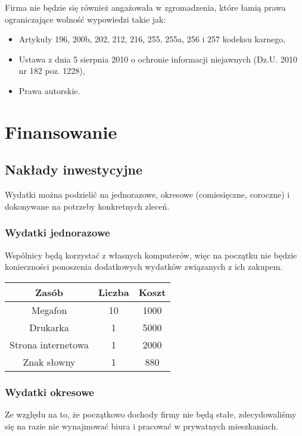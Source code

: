 \documentclass{article}
\begin{document}
Firma nie będzie się również angażowała w zgromadzenia, które łamią prawa ograniczające wolność wypowiedzi takie jak:
\begin{itemize}
\item Artykuły 196, 200b, 202, 212, 216, 255, 255a, 256 i 257 kodeksu karnego, 
\item Ustawa z dnia 5 sierpnia 2010 o ochronie informacji niejawnych (Dz.U. 2010 nr 182 poz. 1228),
\item Prawa autorskie.
\end{itemize}


\section{Finansowanie}
\subsection{Nakłady inwestycyjne}
Wydatki można podzielić na jednorazowe, okresowe (comiesięczne, coroczne) i dokonywane na potrzeby konkretnych zleceń.

\subsubsection{Wydatki jednorazowe}
Wspólnicy będą korzystać z własnych komputerów, więc na początku nie będzie konieczności ponoszenia dodatkowych wydatków związanych z ich zakupem.
\begin{table}[!ht]
\label{table2}
\vspace{0.3cm}
\hspace{-2cm}
\centering
\begin{tabular}{|c|c|c|}
\hline
Zasób & Liczba & Koszt \\
\hline
Megafon & 10 & 1000 \\
Drukarka & 1 & 5000 \\
Strona internetowa & 1 & 2000 \\
Znak słowny & 1 & 880 \\
\hline
\end{tabular}
\end{table}

\subsubsection{Wydatki okresowe}
Ze względu na to, że początkowo dochody firmy nie będą stałe, zdecydowaliśmy się na razie nie wynajmować biura i pracować w prywatnych mieszkaniach.
\end{document}
